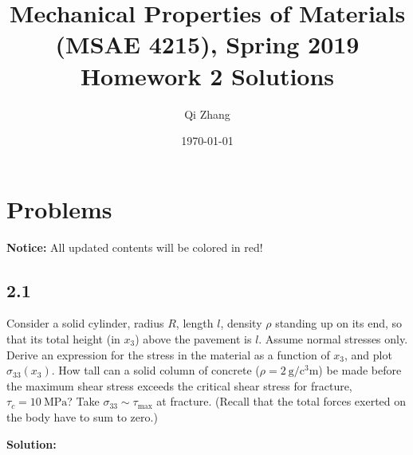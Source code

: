 \documentclass[12pt]{article}
\begin{document}

\title{Mechanical Properties of Materials (MSAE 4215), Spring 2019\\ Homework 2 Solutions}
\author{Qi Zhang}
\date{\today}

\maketitle

\tableofcontents
\listoffigures

\section{Problems}
{\color{red} \textbf{Notice:} All updated contents will be colored in red!}
\subsection{2.1}
Consider a solid cylinder, radius $R$, length $l$, density $\rho$ standing up on its end,
so that its total height (in $x_3$) above the pavement is $l$. Assume normal stresses only.
Derive an expression for the stress in the material as a function of $x_3$, and
plot $\sigma_{33}(x_3)$. How tall can a solid column of concrete ($\rho = \SI{2}{\gram\per\cubic\centi\meter}$)
be made before the maximum shear stress exceeds the critical shear stress for
fracture, $\tau_c = \SI{10}{\mega\pascal}$? Take $\sigma_{33} \sim \tau_\text{max}$ at fracture.
(Recall that the total forces exerted on the body have to sum to zero.)

\textbf{Solution:}
\end{document}

